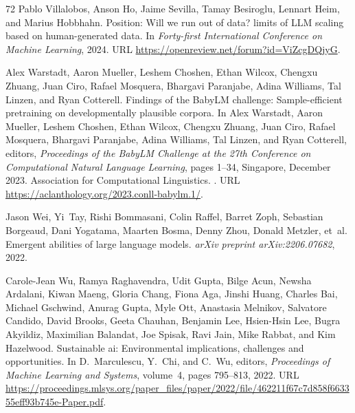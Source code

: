 \begin{thebibliography}{72}
Pablo Villalobos, Anson Ho, Jaime Sevilla, Tamay Besiroglu, Lennart Heim, and Marius Hobbhahn.
\newblock Position: Will we run out of data? limits of {LLM} scaling based on human-generated data.
\newblock In \emph{Forty-first International Conference on Machine Learning}, 2024.
\newblock URL \url{https://openreview.net/forum?id=ViZcgDQjyG}.

Alex Warstadt, Aaron Mueller, Leshem Choshen, Ethan Wilcox, Chengxu Zhuang, Juan Ciro, Rafael Mosquera, Bhargavi Paranjabe, Adina Williams, Tal Linzen, and Ryan Cotterell.
\newblock Findings of the {B}aby{LM} challenge: Sample-efficient pretraining on developmentally plausible corpora.
\newblock In Alex Warstadt, Aaron Mueller, Leshem Choshen, Ethan Wilcox, Chengxu Zhuang, Juan Ciro, Rafael Mosquera, Bhargavi Paranjabe, Adina Williams, Tal Linzen, and Ryan Cotterell, editors, \emph{Proceedings of the BabyLM Challenge at the 27th Conference on Computational Natural Language Learning}, pages 1--34, Singapore, December 2023. Association for Computational Linguistics.
\newblock {}.
\newblock URL \url{https://aclanthology.org/2023.conll-babylm.1/}.

Jason Wei, Yi~Tay, Rishi Bommasani, Colin Raffel, Barret Zoph, Sebastian Borgeaud, Dani Yogatama, Maarten Bosma, Denny Zhou, Donald Metzler, et~al.
\newblock Emergent abilities of large language models.
\newblock \emph{arXiv preprint arXiv:2206.07682}, 2022.

Carole-Jean Wu, Ramya Raghavendra, Udit Gupta, Bilge Acun, Newsha Ardalani, Kiwan Maeng, Gloria Chang, Fiona Aga, Jinshi Huang, Charles Bai, Michael Gschwind, Anurag Gupta, Myle Ott, Anastasia Melnikov, Salvatore Candido, David Brooks, Geeta Chauhan, Benjamin Lee, Hsien-Hsin Lee, Bugra Akyildiz, Maximilian Balandat, Joe Spisak, Ravi Jain, Mike Rabbat, and Kim Hazelwood.
\newblock Sustainable ai: Environmental implications, challenges and opportunities.
\newblock In D.~Marculescu, Y.~Chi, and C.~Wu, editors, \emph{Proceedings of Machine Learning and Systems}, volume~4, pages 795--813, 2022.
\newblock URL \url{https://proceedings.mlsys.org/paper_files/paper/2022/file/462211f67c7d858f663355eff93b745e-Paper.pdf}.


\end{thebibliography}
